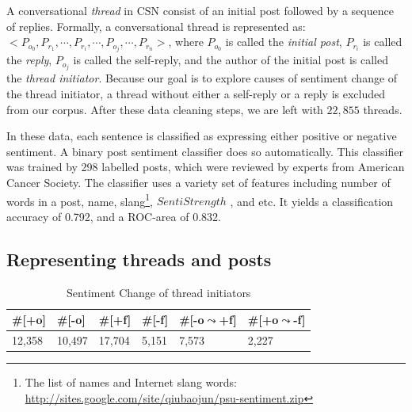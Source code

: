 A conversational \emph{thread} in CSN consist of  an initial post followed by a sequence of replies. Formally, a conversational thread is represented as: $< P_{o_{0}}, P_{r_{1}},\cdots , P_{r_{i}}, \cdots, P_{o_{j}},\cdots ,P_{r_{n}}>$, where $P_{o_{0}}$ is called the \emph{initial post}, $P_{r_{i}}$ is called the \emph{reply}, $P_{o_{j}}$ is called the self-reply, and the author of the initial post is called the \emph{thread initiator}.  Because our goal is to explore causes of sentiment change of the thread initiator, a thread without either a self-reply or a reply is excluded from our corpus. After these data cleaning steps, we are left with $22,855$ threads.

In these data, each sentence is classified as expressing either positive or negative sentiment.  A binary post sentiment classifier  \parencite{qiu2011get} does so automatically. This classifier was trained by 298 labelled posts, which were reviewed by experts from American Cancer Society. The classifier uses a variety set of features including number of words in a post, name, slang\footnote{The list of names and Internet slang words: \url{http://sites.google.com/site/qiubaojun/psu-sentiment.zip}}, $SentiStrength$ \parencite{thelwall2010sentiment}, and etc. It yields a classification accuracy of 0.792, and a ROC-area of 0.832.


\subsection{Representing threads and posts}

\begin{table}[]
\centering
\begin{tabular}{|l|l|l|l|l|l|}
\hline
\#{[}+o{]} & \#{[}-o{]} & \#{[}+f{]} & \#{[}-f{]} & \#{[}-o$\leadsto$+f{]} & \#{[}+o$\leadsto$-f{]} \\ \hline
12,358        &    10,497        &   17,704         &       5,151     &        7,573                   &               2,227            \\ \hline
\end{tabular}
\caption{\label{tab:SentiChange}Sentiment Change of thread initiators}
\up
\end{table}

